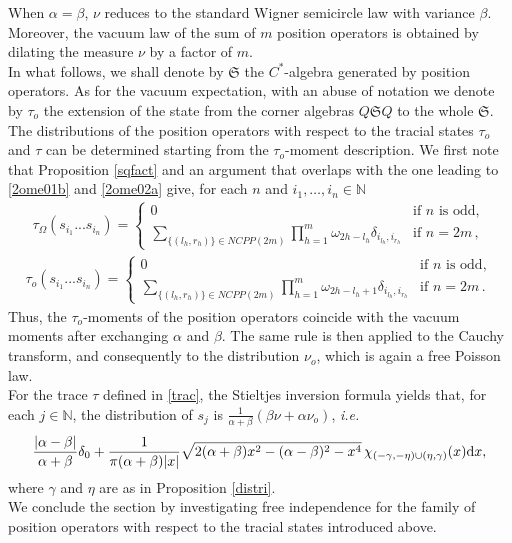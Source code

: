 \documentclass[12pt]{amsart}
\numberwithin{equation}{section}
\def\gs{{\mathfrak S}}\def\gps{{\mathfrak s}}
\def\bn{{\mathbb N}}
\def\a{\alpha}
\def\b{\beta}
\def\g{\gamma}  \def\G{\Gamma}
\def\t{\tau}
\def\om{\omega} \def\Om{\Omega}
\theoremstyle{definition}
\def\di{\mathop{\rm d}\!}
\def\di{{\rm d}}
\begin{document}
When $\a = \b$, $\nu$ reduces to the standard Wigner semicircle law with variance $\b$. Moreover, the vacuum law of the sum of $m$ position operators is obtained by dilating the measure $\nu$ by a factor of $m$.\\
In what follows, we shall denote by $\gs$ the $C^*$-algebra generated by position operators. As for the vacuum expectation, with an abuse of notation we denote by $\t_o$ the extension of the state from the corner algebras $Q\gs Q$ to the whole $\gs$.\\
The distributions of the position operators with respect to the tracial states $\t_o$ and $\t$ can be determined starting from the $\t_o$-moment description. We first note that Proposition \ref{sqfact} and an argument that overlaps with the one leading to \eqref{2ome01b} and \eqref{2ome02a} give, for each $n$ and $i_1,\ldots,i_n\in\bn$
\begin{align}\label{momo2}
\t_\Omega(s_{i_1}...s_{i_n})=
\begin{cases}
0 & \text{if $n$ is odd},\\
\displaystyle
\sum_{\{(l_h,r_h)\}\in NCPP(2m)}\prod_{h=1}^m \om_{2h-l_h}\delta_{i_{l_h},i_{r_h}}
& \text{if $n=2m$}\,,
\end{cases}
\end{align}
\begin{align}\label{momo3}
\t_o(s_{i_1}...s_{i_n})=
\begin{cases}
0 & \text{if $n$ is odd},\\
\displaystyle
\sum_{\{(l_h,r_h)\}\in NCPP(2m)}\prod_{h=1}^m \om_{2h-l_h+1}\delta_{i_{l_h},i_{r_h}}
& \text{if $n=2m$}\,.
\end{cases}
\end{align}
Thus, the $\t_o$-moments of the position operators coincide with the vacuum moments after exchanging $\a$ and $\b$. The same rule is then applied to the Cauchy transform, and consequently to the distribution $\nu_o$, which is again a free Poisson law.\\
For the trace $\t$ defined in \eqref{trac}, the Stieltjes inversion formula yields that, for each $j\in\bn$, the distribution of $s_j$ is $\displaystyle{\frac{1}{\a+\b}(\b\nu+\a\nu_o)}$, \textit{i.e.}
$$
\frac{|\a-\b|}{\a+ \b} \delta_0 +  \frac{1}{\pi (\a+\b) |x|} \sqrt{2(\alpha+\beta)x^2 - (\alpha-\beta)^2 - x^4}\, \chi_{(-\gamma, -\eta) \cup (\eta, \gamma)}(x) \di x,
$$
where $\g$ and $\eta$ are as in Proposition \ref{distri}.\\
We conclude the section by investigating free independence for the family of position operators with respect to the tracial states introduced above.\\
\end{document}

